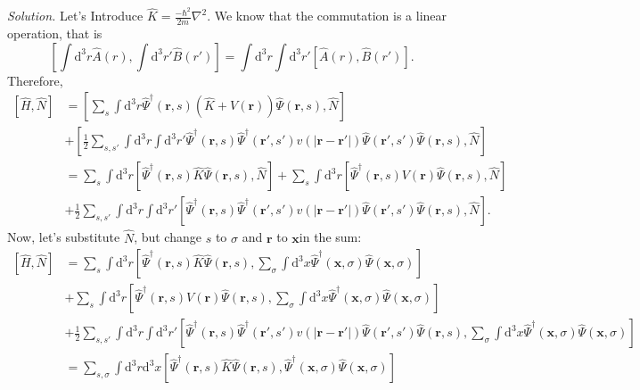 \documentclass[11pt, a4paper]{article}
\newcommand{\bb}[1]{\mathbf{#1}}
\newcommand{\dd}{\mathrm{d}}
\begin{document}
\begin{enumerate}
    \par\textit{Solution.}
    Let's Introduce $\hat K = \frac{-\hbar^2}{2m}\nabla^2$. We know that the commutation is a linear operation,
    that is 
    \begin{equation*}
        \left[\int \dd ^3r \hat A(r) , \int \dd^3 r' \hat B (r') \right] = \int \dd ^3r \int \dd^3 r' \left[\hat A(r), \hat B(r')\right].
    \end{equation*}
    Therefore, 
    \begin{align*}
        \left[\hat H, \hat N\right] & = \left[\sum\limits_s \int \dd^3r\hat\Psi^{\dagger}(\bb r, s) \left(\hat K + V(\bb r)\right)\hat\Psi(\bb r, s), \hat N \right]\\
        & + \left[\frac{1}{2}\sum\limits_{s, s'}\int \dd^3r\int\dd^3r' \hat\Psi^{\dagger}(\bb r, s) \hat\Psi^{\dagger}(\bb r', s')v(|\bb r - \bb r'|)\hat\Psi(\bb r', s')\hat\Psi(\bb r, s), \hat N\right]
        \\
        & = \sum\limits_s \int \dd^3r \left[ \hat\Psi^{\dagger}(\bb r, s)\hat K\hat\Psi(\bb r, s) , \hat N \right]
        + \sum\limits_s \int \dd^3r \left[ \hat\Psi^{\dagger}(\bb r, s)V(\bb r)\hat\Psi(\bb r, s), \hat N \right]\\
        & + \frac{1}{2}\sum\limits_{s, s'}\int \dd^3r\int\dd^3r' \left[\hat\Psi^{\dagger}(\bb r, s) \hat\Psi^{\dagger}(\bb r', s')v(|\bb r - \bb r'|)\hat\Psi(\bb r', s')\hat\Psi(\bb r, s), \hat N\right].
    \end{align*}
    Now, let's substitute $\hat N$, but change $s$ to $\sigma$ and $\bb r$ to $\bb x$in the sum:
    \begin{align*}
        \left[\hat H, \hat N\right] & = \sum\limits_s \int \dd^3r \left[ \hat\Psi^{\dagger}(\bb r, s)\hat K\hat\Psi(\bb r, s) , \sum\limits_{\sigma}\int\dd^3 x\hat\Psi^{\dagger}(\bb x, \sigma)\hat\Psi(\bb x, \sigma) \right]\\
        & + \sum\limits_s \int \dd^3r \left[ \hat\Psi^{\dagger}(\bb r, s)V(\bb r)\hat\Psi(\bb r, s), \sum\limits_{\sigma}\int\dd^3 x\hat\Psi^{\dagger}(\bb x, \sigma)\hat\Psi(\bb x, \sigma) \right]\\
        & + \frac{1}{2}\sum\limits_{s, s'}\int \dd^3r\int\dd^3r' \left[\hat\Psi^{\dagger}(\bb r, s)
        \hat\Psi^{\dagger}(\bb r', s')v(|\bb r - \bb r'|)\hat\Psi(\bb r', s')\hat\Psi(\bb r, s), \sum\limits_{\sigma}\int\dd^3 x\hat\Psi^{\dagger}(\bb x, \sigma)\hat\Psi(\bb x, \sigma) \right]
        \\
        & = \sum\limits_{s, \sigma} \int \dd^3r\dd^3 x  \left[ \hat\Psi^{\dagger}(\bb r, s)\hat K\hat\Psi(\bb r, s) ,\hat\Psi^{\dagger}(\bb x, \sigma)\hat\Psi(\bb x, \sigma) \right]\\

\end{align*}
\end{enumerate}
\end{document}
